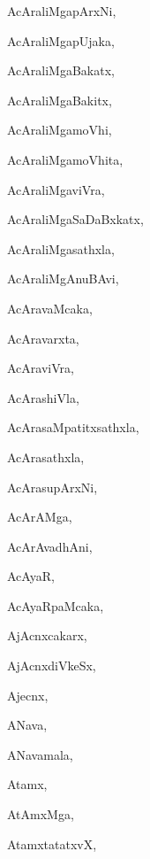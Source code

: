 \begin{multicols}{3}
{\noindent
{AcAraliMgapArxNi}, \pageref{AcAraliMgapArxNi}

\noindent
{AcAraliMgapUjaka}, \pageref{AcAraliMgapUjaka}

\noindent
{AcAraliMgaBakatx}, \pageref{AcAraliMgaBakatx}

\noindent
{AcAraliMgaBakitx}, \pageref{AcAraliMgaBakitx}

\noindent
{AcAraliMgamoVhi}, \pageref{AcAraliMgamoVhi}

\noindent
{AcAraliMgamoVhita}, \pageref{AcAraliMgamoVhita}

\noindent
{AcAraliMgaviVra}, \pageref{AcAraliMgaviVra}

\noindent
{AcAraliMgaSaDaBxkatx}, \pageref{AcAraliMgaSaDaBxkatx}

\noindent
{AcAraliMgasathxla}, \pageref{AcAraliMgasathxla}

\noindent
{AcAraliMgAnuBAvi}, \pageref{AcAraliMgAnuBAvi}

\noindent
{AcAravaMcaka}, \pageref{AcAravaMcaka}

\noindent
{AcAravarxta}, \pageref{AcAravarxta}

\noindent
{AcAraviVra}, \pageref{AcAraviVra}

\noindent
{AcArashiVla}, \pageref{AcArashiVla}

\noindent
{AcArasaMpatitxsathxla}, \pageref{AcArasaMpatitxsathxla}

\noindent
{AcArasathxla}, \pageref{AcArasathxla}

\noindent
{AcArasupArxNi}, \pageref{AcArasupArxNi}

\noindent
{AcArAMga}, \pageref{AcArAMga}

\noindent
{AcArAvadhAni}, \pageref{AcArAvadhAni}

\noindent
{AcAyaR}, \pageref{AcAyaR}

\noindent
{AcAyaRpaMcaka}, \pageref{AcAyaRpaMcaka}

\noindent
{AjAcnxcakarx}, \pageref{AjAcnxcakarx}

\noindent
{AjAcnxdiVkeSx}, \pageref{AjAcnxdiVkeSx}

\noindent
{Ajecnx}, \pageref{Ajecnx}

\noindent
{ANava}, \pageref{ANava}

\noindent
{ANavamala}, \pageref{ANavamala}

\noindent
{Atamx}, \pageref{Atamx}

\noindent
{AtAmxMga}, \pageref{AtAmxMga}

\noindent
{AtamxtatatxvX}, \pageref{AtamxtatatxvX}

}
\end{multicols}
